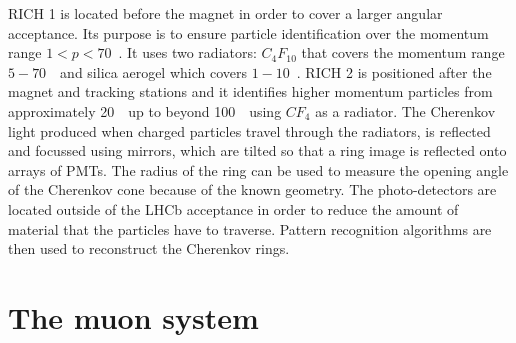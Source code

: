 RICH 1 is located before the magnet in order to cover a larger angular acceptance. Its purpose is to ensure
particle identification over the momentum range \mbox{$1 < p < 70$~\gevc}. It uses two radiators: $C_4F_{10}$ that covers
the momentum range $5-70$~\gevc~and silica aerogel which covers $1-10$~\gevc. RICH 2 is positioned after
the magnet and tracking stations and it identifies higher momentum particles from approximately 20~\gevc~up to beyond
100~\gevc~using $CF_4$ as a radiator.
The Cherenkov light produced when charged particles travel through the radiators, is reflected and focussed using
mirrors, which are tilted so that a ring image is reflected onto arrays of PMTs.
The radius of the ring can be used to measure the opening angle of the Cherenkov cone because of the known geometry.
The photo-detectors are located outside of the LHCb acceptance in order to reduce the amount of material that
the particles have to traverse. Pattern recognition algorithms are then used to reconstruct the Cherenkov rings.



\section{The muon system}

